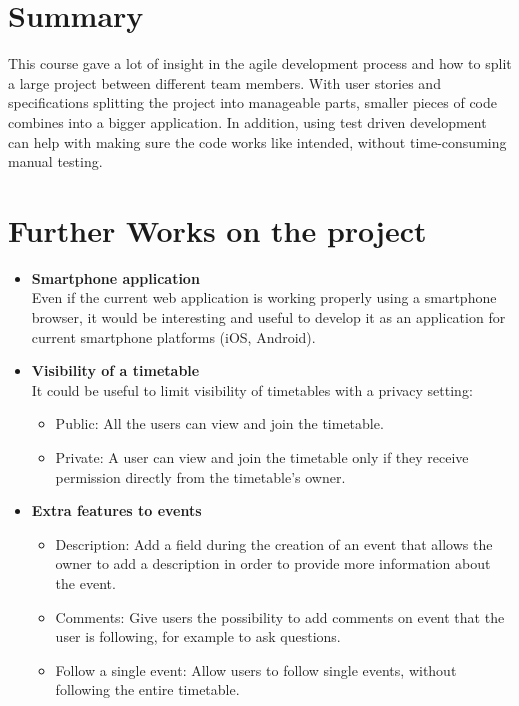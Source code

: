 
\section{Summary}
\vspace{-5mm}
This course gave a lot of insight in the agile development process and how to split a large project between different team members. With user stories and specifications splitting the project into manageable parts, smaller pieces of code combines into a bigger application. In addition, using test driven development can help with making sure the code works like intended, without time-consuming manual testing.

\section{Further Works on the project}
\vspace{-5mm}
\begin{itemize}
\item \textbf{Smartphone application}\\ Even if the current web application is working properly using a smartphone browser, it would be interesting and useful to develop it as an application for current smartphone platforms (iOS, Android).
\item \textbf{Visibility of a timetable}\\
It could be useful to limit visibility of timetables with a privacy setting:
\vspace{-3mm}
\begin{itemize}
	\item Public: All the users can view and join the timetable.
	\item Private: A user can view and join the timetable only if they receive permission directly from the timetable's owner.
\end{itemize}
\item \textbf{Extra features to events}
\vspace{-3mm}
\begin{itemize}
	\item Description: Add a field during the creation of an event that allows the owner to add a description in order to provide more information about the event.
	\item Comments: Give users the possibility to add comments on event that the user is following, for example to ask questions.
	\item Follow a single event: Allow users to follow single events, without following the entire timetable.
\end{itemize}
\end{itemize}


